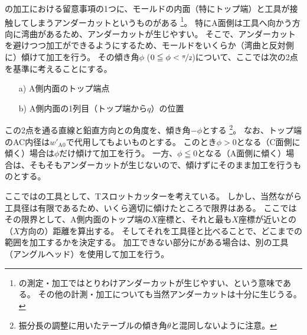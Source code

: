 \clearpage
\dimple の加工における留意事項の1つに、モールドの内面（特にトップ端）と工具が接触してしまうアンダーカットというものがある
\footnote{\dimple の測定・加工ではとりわけアンダーカットが生じやすい、という意味である。
その他の計測・加工についても当然アンダーカットは十分に生じうる。}。
特にA面側は工具へ向かう方向に湾曲があるため、アンダーカットが生じやすい。
そこで、アンダーカットを避けつつ加工ができるようにするため、モールドをいくらか（湾曲と反対側に）傾けて加工を行う。
その傾き角$\phi$ ($0 \leqq \phi < \nicefrac\pi2$)について、ここでは次の2点を基準に考えることにする。
\begin{tcolorbox}[title=A面の\dimple, fonttitle=\gtfamily\bfseries]
\begin{enumerate}
\item[a)] A側内面のトップ端点
\item[b)] A側内面の\dimple1列目（トップ端から$q$）の位置
\end{enumerate}
\end{tcolorbox}\noindent
この2点を通る直線と鉛直方向との角度を、傾き角$-\phi$とする
\footnote{振分長の調整に用いたテーブルの傾き角$\theta$と混同しないように注意。}。
なお、トップ端のAC内径は$w'_{\mathrm A0}$で代用してもよいものとする。
このとき$\phi > 0$となる（C面側に傾く）場合は$\phi$だけ傾けて加工を行う。
一方、$\phi \leqq 0$となる（A面側に傾く）場合は、そもそもアンダーカットが生じないので、傾けずにそのまま加工を行うものとする。
\begin{hosoku}
ここでは\dimple の工具として、Tスロットカッターを考えている。
しかし、当然ながら工具径は有限であるため、いくら適切に傾けたところで限界はある。
ここではその限界として、A側内面のトップ端の$X$座標と、それと最も$X$座標が近い\dimple との（$X$方向の）距離を算出する。
そしてそれを工具径と比べることで、どこまでの範囲を加工するかを決定する。
加工できない部分に\dimple がある場合は、別の工具（アングルヘッド）を使用して加工を行う。
\end{hosoku}
